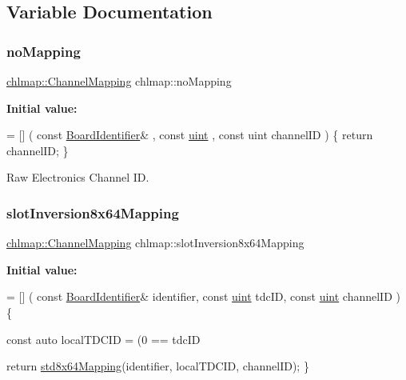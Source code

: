 \subsection{Variable Documentation}
\mbox{\label{namespacechlmap_adeefba45d9765c580e5f7ef9cb99acc5}} 
\subsubsection{\texorpdfstring{no\+Mapping}{noMapping}}
{\footnotesize\ttfamily \hyperlink{namespacechlmap_a5bb86fec567a6f1a0646881a9284bb01}{chlmap\+::\+Channel\+Mapping} chlmap\+::no\+Mapping}

{\bfseries Initial value\+:}
\begin{DoxyCode}
= [] (
    \textcolor{keyword}{const} \hyperlink{class_board_identifier}{BoardIdentifier}& ,
    \textcolor{keyword}{const} \hyperlink{namespacechlmap_a51093e4e5b1ccf24696e04d671728200}{uint} ,
    \textcolor{keyword}{const} uint channelID
) \{
    \textcolor{keywordflow}{return} channelID;
\}
\end{DoxyCode}


Raw Electronics Channel ID. 

\mbox{\label{namespacechlmap_addbd4a4856137809b06e1bffd39e2897}} 
\subsubsection{\texorpdfstring{slot\+Inversion8x64\+Mapping}{slotInversion8x64Mapping}}
{\footnotesize\ttfamily \hyperlink{namespacechlmap_a5bb86fec567a6f1a0646881a9284bb01}{chlmap\+::\+Channel\+Mapping} chlmap\+::slot\+Inversion8x64\+Mapping}

{\bfseries Initial value\+:}
\begin{DoxyCode}
= [] (
    \textcolor{keyword}{const} \hyperlink{class_board_identifier}{BoardIdentifier}& identifier,
    \textcolor{keyword}{const} \hyperlink{_packet_8cpp_a69aa29b598b851b0640aa225a9e5d61d}{uint} tdcID,
    \textcolor{keyword}{const} \hyperlink{_packet_8cpp_a69aa29b598b851b0640aa225a9e5d61d}{uint} channelID
) \{
    
    \textcolor{keyword}{const} \textcolor{keyword}{auto} localTDCID = (0 == tdcID%

    
    \textcolor{keywordflow}{return} \hyperlink{namespacechlmap_a11d7121de30a32ead9032c59221b7442}{std8x64Mapping}(identifier, localTDCID, channelID);
\}
\end{DoxyCode}


